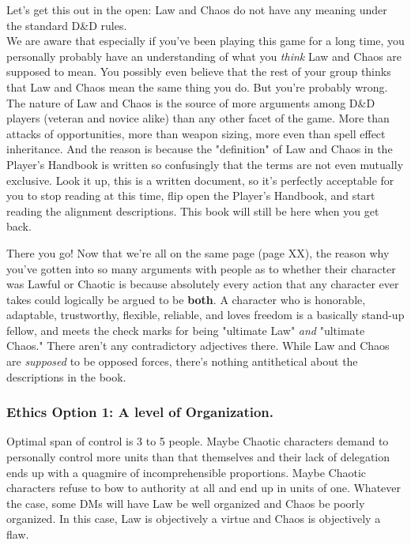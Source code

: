 Let's get this out in the open: Law and Chaos do not have any meaning under the standard D\&D rules.\\

We are aware that especially if you've been playing this game for a long time, you personally probably have an understanding of what you \textit{think} Law and Chaos are supposed to mean. You possibly even believe that the rest of your group thinks that Law and Chaos mean the same thing you do. But you're probably wrong. The nature of Law and Chaos is the source of more arguments among D\&D players (veteran and novice alike) than any other facet of the game. More than attacks of opportunities, more than weapon sizing, more even than spell effect inheritance. And the reason is because the "definition" of Law and Chaos in the Player's Handbook is written so confusingly that the terms are not even mutually exclusive. Look it up, this is a written document, so it's perfectly acceptable for you to stop reading at this time, flip open the Player's Handbook, and start reading the alignment descriptions. This book will still be here when you get back.

There you go! Now that we're all on the same page (page XX), the reason why you've gotten into so many arguments with people as to whether their character was Lawful or Chaotic is because absolutely every action that any character ever takes could logically be argued to be \textbf{both}. A character who is honorable, adaptable, trustworthy, flexible, reliable, and loves freedom is a basically stand-up fellow, and meets the check marks for being "ultimate Law" \textit{and} "ultimate Chaos." There aren't any contradictory adjectives there. While Law and Chaos are \textit{supposed} to be opposed forces, there's nothing antithetical about the descriptions in the book.


\subsubsection{Ethics Option 1: A level of Organization.}
Optimal span of control is 3 to 5 people. Maybe Chaotic characters demand to personally control more units than that themselves and their lack of delegation ends up with a quagmire of incomprehensible proportions. Maybe Chaotic characters refuse to bow to authority at all and end up in units of one. Whatever the case, some DMs will have Law be well organized and Chaos be poorly organized. In this case, Law is objectively a virtue and Chaos is objectively a flaw.

